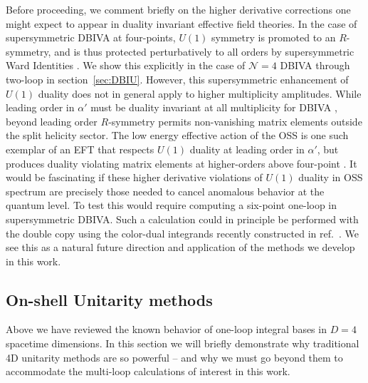 \documentclass[11pt,letter]{article}
\def\sect#1{section~\ref{#1}}
\begin{document}
Before proceeding, we comment briefly on the higher derivative corrections one might expect to appear in duality invariant effective field theories. In the case of supersymmetric DBIVA at four-points, $U(1)$ symmetry is promoted to an $R$-symmetry, and is thus protected perturbatively to all orders by supersymmetric Ward Identities \cite{Heydeman:2017yww}. We show this explicitly in the case of $\mathcal{N}=4$ DBIVA through two-loop in \sect{sec:DBIU}. However, this supersymmetric enhancement of $U(1)$ duality does not in general apply to higher multiplicity amplitudes. While leading order in $\alpha'$ must be duality invariant at all multiplicity for DBIVA \cite{Pavao:2022kog}, beyond leading order $R$-symmetry permits non-vanishing matrix elements outside the split helicity sector. The low energy effective action of the OSS is one such exemplar of an EFT that respects $U(1)$ duality at leading order in $\alpha'$, but produces duality violating matrix elements at higher-orders above four-point \cite{Carrasco:2016ldy}. It would be fascinating if these higher derivative violations of $U(1)$ duality in OSS spectrum are precisely those needed to cancel anomalous behavior at the quantum level. To test this would require computing a six-point one-loop in supersymmetric DBIVA. Such a calculation could in principle be performed with the double copy using the color-dual integrands recently constructed in ref.~\cite{Edison:2022jln}. We see this as a natural future direction and application of the methods we develop in this work. 

\subsection{On-shell Unitarity methods}\label{sec:genU}
Above we have reviewed the known behavior of one-loop integral bases in $D=4$ spacetime dimensions. In this section we will briefly demonstrate why traditional 4D unitarity methods are so powerful -- and why we must go beyond them to accommodate the multi-loop calculations of interest in this work. 
\end{document}
